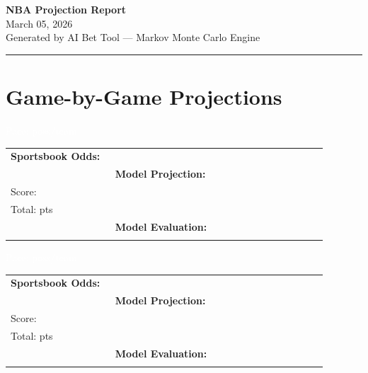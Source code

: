 \documentclass[10pt,a4paper]{article}
\begin{document}
\begin{center}
{\Huge\bfseries\textcolor{accent}{NBA Projection Report}}\\[4pt]
{\large\textcolor{accentgold}{March 05, 2026}}\\[2pt]
{\small\textcolor{midgray}{Generated by AI Bet Tool — Markov Monte Carlo Engine}}
\end{center}
\vspace{4pt}
\noindent\textcolor{accent}{\rule{\linewidth}{1.2pt}}
\vspace{6pt}

\newpage

\section*{Game-by-Game Projections}

\noindent\colorbox{matchupbar}{\parbox{\dimexpr\linewidth-2\fboxsep}{%
  \vspace{3pt}\hspace{4pt}{\bfseries\large\textcolor{white}{Cleveland Cavaliers @ Portland Trail Blazers}}
  \hfill{\small\textcolor{white}{Pace:  poss/team}}\vspace{3pt}
}}
\vspace{4pt}

\begin{tabular}{@{}p{0.32\linewidth}p{0.32\linewidth}p{0.33\linewidth}@{}}
\small
\textbf{Sportsbook Odds:} \\
&
\textbf{Model Projection:} \\
Score: \textbf{}\\
Total: \textbf{} pts\\
&
\textbf{Model Evaluation:} \\
\\
\end{tabular}

\vspace{8pt}

\noindent\colorbox{matchupbar}{\parbox{\dimexpr\linewidth-2\fboxsep}{%
  \vspace{3pt}\hspace{4pt}{\bfseries\large\textcolor{white}{Oklahoma City Thunder @ Denver Nuggets}}
  \hfill{\small\textcolor{white}{Pace:  poss/team}}\vspace{3pt}
}}
\vspace{4pt}

\begin{tabular}{@{}p{0.32\linewidth}p{0.32\linewidth}p{0.33\linewidth}@{}}
\small
\textbf{Sportsbook Odds:} \\
&
\textbf{Model Projection:} \\
Score: \textbf{}\\
Total: \textbf{} pts\\
&
\textbf{Model Evaluation:} \\
\\
\end{tabular}
\end{document}

